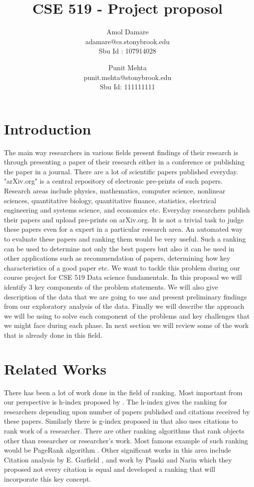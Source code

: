 \documentclass[a4paper, 11pt]{article}
\begin{document}
\title{CSE 519 - Project proposol}
\author{Amol Damare \\ adamare@cs.stonybrook.edu \\Sbu Id : 107914028
\and
Punit Mehta \\ punit.mehta@stonybrook.edu \\Sbu Id: 111111111}
\maketitle
\section{Introduction}
The main way researchers in various fields present findings of their research is through presenting a paper of their research either in a conference or publishing the paper in a journal. There are a lot of scientific papers published everyday. "arXiv.org" is a central repository of electronic pre-prints of such papers. Research areas include physics, mathematics, computer science, nonlinear sciences, quantitative biology, quantitative finance, statistics, electrical engineering and systems science, and economics etc.  Everyday researchers publish their papers and upload pre-prints on arXiv.org.  It is not a trivial task to judge these papers even for a expert in a particular research area. An automated way to evaluate these papers and ranking them would be very useful. Such a ranking can be used to determine not only the best papers but also it can be used in other applications such as recommendation of papers, determining how key characteristics of a good paper etc. We want to tackle this problem during our course project for CSE 519 Data science fundamentals. In this proposal we will identify 3 key components of the problem statements. We will also give description of the data that we are going to use and present preliminary findings from our exploratory analysis of the data.  Finally we will describe the approach we will be using to solve each component of the problems and key challenges that we might face during each phase. In next section we will review some of the work that is already done in this field.
\section{Related Works}
There has been a lot of work done in the field of ranking. Most important from our perspective is h-index proposed by \cite{Hirsch}. The h-index gives the ranking for researchers depending upon number of papers published and citations received by these papers.
Similarly there is g-index proposed in \cite{gindex} that also uses citations to rank work of a researcher. There are other ranking algorithms that rank objects other than researcher or researcher's work. Most famous example of such ranking would be PageRank algorithm \cite{pagerank}. Other significant works in this area include Citation analysis by E. Garfield \cite{garfield}, and work by Pinski and Narin \cite{pinski} which they proposed not every citation is equal and developed a ranking that will incorporate this key concept.
\end{document}
